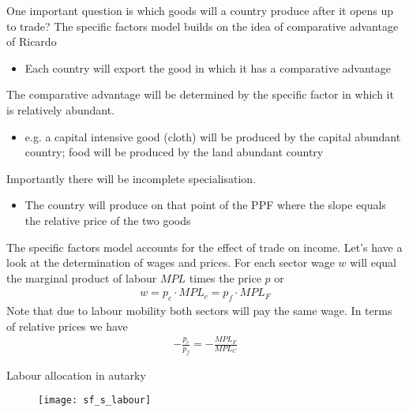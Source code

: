 \documentclass{beamer}
\begin{document}
\begin{frame}
  One important question is which goods will a country produce after it opens up to trade?
  The specific factors model builds on the idea of comparative advantage of Ricardo
  \begin{itemize}
    \item Each country will export the good in which it has a comparative advantage
  \end{itemize}
  \medskip
  The comparative advantage will be determined by the specific factor in which it is relatively abundant. 
    \begin{itemize}
    \item e.g. a capital intensive good (cloth) will be produced by the capital abundant country; food will be produced by the land abundant country    
  \end{itemize}
  \medskip  
  Importantly there will be incomplete specialisation. 
  \begin{itemize}
    \item The country will produce on that point of the PPF where the slope equals the relative price of the two goods
  \end{itemize}
\end{frame}

\begin{frame}
  The specific factors model accounts for the effect of trade on income. 
  Let's have a look at the determination of wages and prices. 
  For each sector wage $w$ will equal the marginal product of labour $MPL$ times the price $p$ or  
    \begin{align*}
    w = p_c\cdot MPL_c = p_f \cdot MPL_F     
  \end{align*}
  \medskip
  Note that due to labour mobility both sectors will pay the same wage.
  In terms of relative prices we have
  \begin{align*}
    - \frac{p_c}{p_f}=-\frac{MPL_F}{MPL_C}
  \end{align*}  
\end{frame}

\begin{frame}{Labour allocation in autarky}
  \begin{figure}
    \texttt{[image: sf\_s\_labour]}
  \end{figure}
\end{frame}
\end{document}
